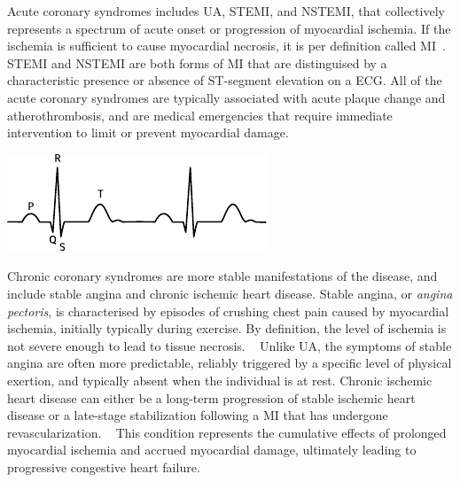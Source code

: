 Acute coronary syndromes includes 
\ac{UA}, \ac{STEMI}, and \ac{NSTEMI},
that collectively represents a spectrum of acute onset or progression of 
myocardial ischemia.
If the ischemia is sufficient to cause myocardial necrosis, 
it is per definition called \ac{MI}~\autocite{thygesenFourth2019}.
\ac{STEMI} and \ac{NSTEMI} are both forms of \ac{MI} that are distinguised
by a characteristic presence or absence of ST-segment elevation on a \ac{ECG}.
All of the acute coronary syndromes are typically associated 
with acute plaque change and atherothrombosis, 
and are medical emergencies that require immediate 
intervention to limit or prevent myocardial damage.
~\autocite{kumarRobbins2014}

\begin{marginfigure}%
    \vspace{1em}
    \includegraphics{graphics/electrocardiogram}
    \caption[Normal QRS complex]{%
        Schematic of a normal sinus rhythm as seen from an ECG. 
        In \ac{STEMI}, the ST-segment is found elevated.
    }
    \vspace{1em}
    \label{fig:ecg}
\end{marginfigure}%

Chronic coronary syndromes are more stable manifestations of the disease,
and include stable angina and chronic ischemic heart disease.
Stable angina, or \textit{angina pectoris}, is characterised by episodes of
crushing chest pain caused by myocardial ischemia, initially typically during
exercise.
By definition, the level of ischemia is not severe enough to lead to
tissue necrosis. 
~\autocite{knuuti20192020}
Unlike \ac{UA}, the symptoms of stable angina are often more predictable,
reliably triggered by a specific level of physical exertion, 
and typically absent when the individual is at rest. 
Chronic ischemic heart disease can either be a long-term progression of stable
ischemic heart disease or a late-stage stabilization following a \ac{MI} that
has undergone revascularization. 
~\autocite{knuuti20192020}
This condition represents the cumulative
effects of prolonged myocardial ischemia and accrued myocardial damage,
ultimately leading to progressive congestive heart failure.
~\autocite{kumarRobbins2014}


